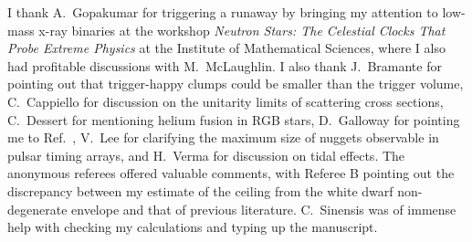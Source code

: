 \documentclass[
    twocolumn,
	prd,
        amssymb,
	preprintnumbers,
	secnumarabic,
	nofootinbib,
	superscriptaddress]{revtex4-1}
\begin{document}
I thank A.~Gopakumar for triggering a runaway by bringing my attention to low-mass x-ray binaries at the workshop {\em Neutron Stars: The Celestial Clocks That Probe Extreme Physics} at the Institute of Mathematical Sciences, where  I also had profitable discussions with M.~McLaughlin. 
I also thank 
J.~Bramante for pointing out that trigger-happy clumps could be smaller than the trigger volume,
C.~Cappiello for discussion on the unitarity limits of scattering cross sections,
C.~Dessert for mentioning helium fusion in RGB stars,
D.~Galloway for pointing me to Ref.~\cite{supburst:catalog2023},
V.~Lee for clarifying the maximum size of nuggets observable in pulsar timing arrays, and
H.~Verma for discussion on tidal effects.
The anonymous referees offered valuable comments, with Referee B pointing out the discrepancy between my estimate of the ceiling from the white dwarf non-degenerate envelope and that of previous literature. 
C.~Sinensis was of immense help with checking my calculations and typing up the manuscript.



\end{document}

